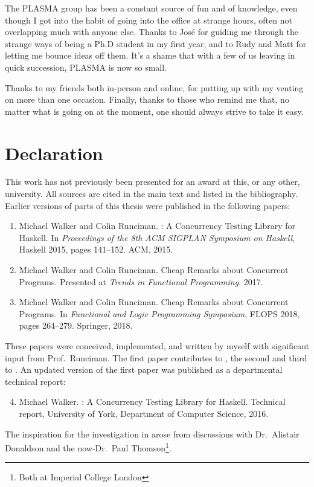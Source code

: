 The PLASMA group has been a constant source of fun and of knowledge,
even though I got into the habit of going into the office at strange
hours, often not overlapping much with anyone else.  Thanks to Jos\'e
for guiding me through the strange ways of being a Ph.D student in my
first year, and to Rudy and Matt for letting me bounce ideas off them.
It's a shame that with a few of us leaving in quick succession, PLASMA
is now so small.

Thanks to my friends both in-person and online, for putting up with my
venting on more than one occasion.  Finally, thanks to those who
remind me that, no matter what is going on at the moment, one should
always strive to take it easy.

\chapter*{Declaration}

This work has not previously been presented for an award at this, or
any other, university.  All sources are cited in the main text and
listed in the bibliography.  Earlier versions of parts of this thesis
were published in the following papers:

\begin{enumerate}
\item Michael Walker and Colin Runciman.  \dejafu{}: A Concurrency
  Testing Library for Haskell.  In \emph{Proceedings of the 8th ACM
    SIGPLAN Symposium on Haskell}, Haskell 2015, pages 141--152.  ACM,
  2015.\nocite{walker2015}
\item Michael Walker and Colin Runciman.  Cheap Remarks about
  Concurrent Programs.  Presented at \emph{Trends in Functional
    Programming}.  2017.\nocite{tfp-coco}
\item Michael Walker and Colin Runciman.  Cheap Remarks about
  Concurrent Programs.  In \emph{Functional and Logic Programming
    Symposium}, FLOPS 2018, pages 264--279.  Springer,
  2018.\nocite{walker2018}
\end{enumerate}

These papers were conceived, implemented, and written by myself with
significant input from Prof.~Runciman.  The first paper contributes to
, the second and third to .  An
updated version of the first paper was published as a departmental
technical report:

\begin{enumerate}
\setcounter{enumi}{3}
\item Michael Walker. \dejafu{}: A Concurrency Testing Library for
  Haskell.  Technical report, University of York, Department of
  Computer Science, 2016.\nocite{YCS-2016-503}
\end{enumerate}

The inspiration for the investigation in  arose
from discussions with Dr.~Alistair Donaldson and the now-Dr.~Paul
Thomson\footnote{Both at Imperial College London}.
